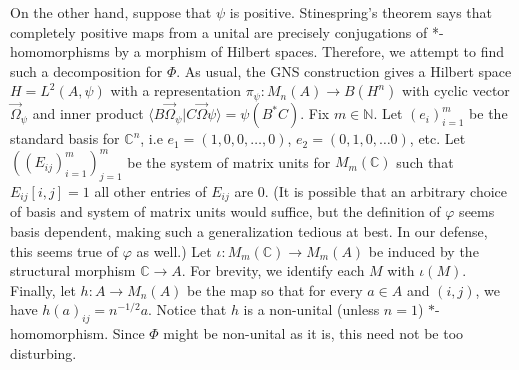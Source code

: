 \documentclass[a4paper,10pt]{report}
\newcommand{\ggen}[1]{\langle#1\rangle}
\newcommand{\N}{\mathbb{N}}
\newcommand{\C}{\mathbb{C}}
\begin{document}
\begin{enumerate}
\begin{enumerate}
				On the other hand, suppose that $\psi$ is positive. 
				Stinespring's theorem says that completely positive maps from a unital {\csa} are precisely conjugations of *-homomorphisms by a morphism of Hilbert spaces. Therefore, we attempt to find such a decomposition for $\Phi$. 
				As usual, the GNS construction gives a Hilbert space $H=L^2(A,\psi)$ with a representation $\pi_\psi:M_n(A)\to B(H^n)$ with cyclic vector $\vec{\Omega}_\psi$ and inner product $\ggen{B\vec{\Omega}_\psi|C\vec{\Omega}\psi}=\psi(B^*C)$. 
				Fix $m\in\N$. Let $(e_i)_{i=1}^m$ be the standard basis for $\C^n$, i.e $e_1=(1,0,0,\ldots, 0)$, $e_2=(0,1,0,\ldots 0)$, etc. Let $((E_{ij})_{i=1}^m)_{j=1}^m$ be the system of matrix units for $M_m(\C)$ such that $E_{ij}[i,j]=1$ all other entries of $E_{ij}$ are $0$.
				(It is possible that an arbitrary choice of basis and system of matrix units would suffice, but the definition of $\varphi$ seems basis dependent, making such a generalization tedious at best. In our defense, this seems true of $\varphi$ as well.)
				Let $\iota:M_m(\C)\to M_m(A)$ be induced by the structural morphism $\C\to A$. For brevity, we identify each $M$ with $\iota(M)$. Finally, let $h:A\to M_n(A)$ be the map so that for every $a\in A$ and $(i,j)$, we have $h(a)_{ij}=n^{-1/2}a$. Notice that $h$ is a non-unital (unless $n=1$) $*$-homomorphism. Since $\Phi$ might be non-unital as it is, this need not be too disturbing. 
				

\end{enumerate}
\end{enumerate}
\end{document}

